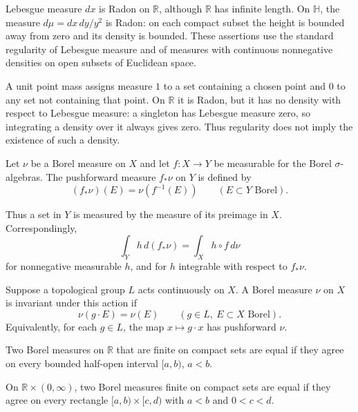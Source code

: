 \begin{example}\label{measure.radon-area-examples}
Lebesgue measure $dx$ is Radon on $\mathbb R$, although $\mathbb R$ has infinite length. On $\mathbb H$, the measure $d\mu=dx\,dy/y^2$ is Radon: on each compact subset the height is bounded away from zero and its density is bounded. These assertions use the standard regularity of Lebesgue measure and of measures with continuous nonnegative densities on open subsets of Euclidean space.
\end{example}

\begin{example}\label{measure.radon-point-mass}
A unit point mass assigns measure $1$ to a set containing a chosen point and $0$ to any set not containing that point. On $\mathbb R$ it is Radon, but it has no density with respect to Lebesgue measure: a singleton has Lebesgue measure zero, so integrating a density over it always gives zero. Thus regularity does not imply the existence of such a density.
\end{example}

\begin{definition}\label{measure.pushforward}
Let $\nu$ be a Borel measure on $X$ and let $f:X\to Y$ be measurable for the Borel $\sigma$-algebras. The pushforward measure $f_*\nu$ on $Y$ is defined by
\[
 (f_*\nu)(E)=\nu(f^{-1}(E))
 \qquad(E\subset Y\text{ Borel}).
\]
\end{definition}

Thus a set in $Y$ is measured by the measure of its preimage in $X$. Correspondingly,
\[
 \int_Y h\,d(f_*\nu)=\int_X h\circ f\,d\nu
\]
for nonnegative measurable $h$, and for $h$ integrable with respect to $f_*\nu$.

\begin{definition}\label{measure.invariant}
Suppose a topological group $L$ acts continuously on $X$. A Borel measure $\nu$ on $X$ is invariant under this action if
\[
 \nu(g\cdot E)=\nu(E)
 \qquad(g\in L,\ E\subset X\text{ Borel}).
\]
Equivalently, for each $g\in L$, the map $x\mapsto g\cdot x$ has pushforward $\nu$.
\end{definition}

\begin{theorem}\label{measure.uniqueness-principle}
Two Borel measures on $\mathbb R$ that are finite on compact sets are equal if they agree on every bounded half-open interval $[a,b)$, $a<b$.

On $\mathbb R\times(0,\infty)$, two Borel measures finite on compact sets are equal if they agree on every rectangle $[a,b)\times[c,d)$ with $a<b$ and $0<c<d$.
\end{theorem}

